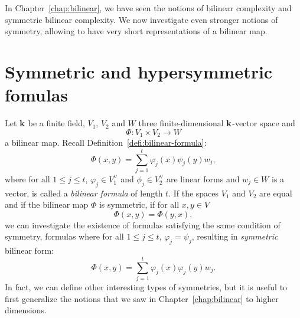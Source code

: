 In Chapter~\ref{chap:bilinear}, we have seen the notions of bilinear complexity
and symmetric bilinear complexity. We now investigate even stronger
notions of symmetry, allowing to have very short representations of a bilinear
map.

\minitoc

%

\clearpage
\section{Symmetric and hypersymmetric fomulas}
%
%
%

Let $\mathbf{k}$ be a finite field, $V_1$, $V_2$ and $W$ three finite-dimensional $\mathbf{k}$-vector
space and
\[
  \Phi:V_1\times V_2\to W
\]
a bilinear map. Recall Definition~\ref{defi:bilinear-formula}:
\[
  \Phi(x, y) = \sum_{j=1}^t\varphi_j(x)\psi_j(y)w_j,
\]
where for all $1\leq j\leq t$, $\varphi_j\in V_1^\vee$ and $\phi_j\in V_2^\vee$ are linear forms and
$w_j\in W$ is a vector, is called a \emph{bilinear formula} of length $t$. If
the spaces $V_1$ and $V_2$ are equal and if the bilinear map $\Phi$ is
symmetric, \ie if for all $x, y\in V$
\[
  \Phi(x, y) = \Phi(y, x),
\]
we can investigate the existence of formulas satisfying the same condition of
symmetry, \ie formulas where for all $1\leq j\leq t$, $\varphi_j=\psi_j$,
resulting in \emph{symmetric} bilinear form:
\[
  \Phi(x, y) = \sum_{j=1}^t\varphi_j(x)\varphi_j(y)w_j.
\]
In fact, we can define other interesting types of symmetries, but it is useful
to first generalize the notions that we saw in Chapter~\ref{chap:bilinear} to
higher dimensions.
